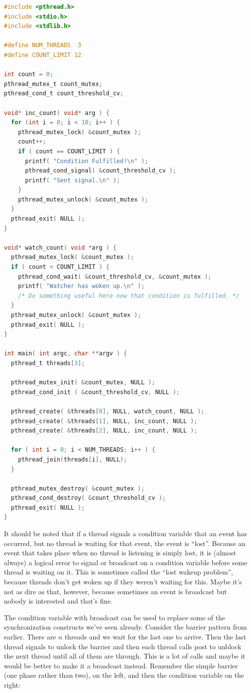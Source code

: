 \documentclass[a4paper]{report}
\begin{document}
\begin{lstlisting}[language=C]
#include <pthread.h>
#include <stdio.h>
#include <stdlib.h>

#define NUM_THREADS  3
#define COUNT_LIMIT 12

int count = 0;
pthread_mutex_t count_mutex;
pthread_cond_t count_threshold_cv;

void* inc_count( void* arg ) {
  for (int i = 0; i < 10; i++ ) {
    pthread_mutex_lock( &count_mutex );
    count++;
    if ( count == COUNT_LIMIT ) {
      printf( "Condition Fulfilled!\n" );
      pthread_cond_signal( &count_threshold_cv );
      printf( "Sent signal.\n" );
    }
    pthread_mutex_unlock( &count_mutex );
  }
  pthread_exit( NULL );
}

void* watch_count( void *arg ) {
  pthread_mutex_lock( &count_mutex );  
  if ( count < COUNT_LIMIT ) {
    pthread_cond_wait( &count_threshold_cv, &count_mutex );
    printf( "Watcher has woken up.\n" );
    /* Do something useful here now that condition is fulfilled. */
  }
  pthread_mutex_unlock( &count_mutex );
  pthread_exit( NULL );
}

int main( int argc, char **argv ) {
  pthread_t threads[3];

  pthread_mutex_init( &count_mutex, NULL );
  pthread_cond_init ( &count_threshold_cv, NULL );

  pthread_create( &threads[0], NULL, watch_count, NULL );
  pthread_create( &threads[1], NULL, inc_count, NULL );
  pthread_create( &threads[2], NULL, inc_count, NULL );

  for ( int i = 0; i < NUM_THREADS; i++ ) {
    pthread_join(threads[i], NULL);
  }
  
  pthread_mutex_destroy( &count_mutex );
  pthread_cond_destroy( &count_threshold_cv );
  pthread_exit( NULL );
}
\end{lstlisting}

It should be noted that if a thread signals a condition variable that an event has occurred, but no thread is waiting for that event, the event is ``lost''.  Because an event that takes place when no thread is listening is simply lost, it is (almost always) a logical error to signal or broadcast on a condition variable before some thread is waiting on it. This is sometimes called the ``lost wakeup problem'', because threads don't get woken up if they weren't waiting for this. Maybe it's not as dire as that, however, because sometimes an event is broadcast but nobody is interested and that's fine.

The condition variable with broadcast can be used to replace some of the synchronization constructs we've seen already. Consider the barrier pattern from earlier. There are $n$ threads and we wait for the last one to arrive. Then the last thread signals to unlock the barrier and then each thread calls post to unblock the next thread until all of them are through. This is a lot of calls and maybe it would be better to make it a broadcast instead. Remember the simple barrier (one phase rather than two), on the left, and then the condition variable on the right:
\end{document}
